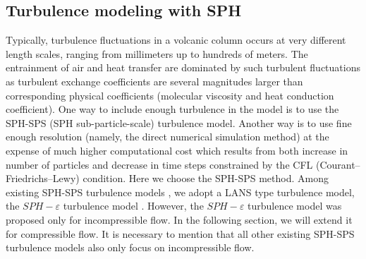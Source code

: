 \documentclass[journal abbreviation, manuscript]{copernicus}
\begin{document}
\subsection{Turbulence modeling with SPH}
Typically, turbulence fluctuations in a volcanic column occurs at very different length scales, ranging from millimeters up to hundreds of meters. The entrainment of air and heat transfer are dominated by such turbulent fluctuations as turbulent exchange coefficients are several magnitudes larger than corresponding physical coefficients (molecular viscosity and heat conduction coefficient). One way to include enough turbulence in the model is to use the SPH-SPS (SPH sub-particle-scale) turbulence model. 
Another way is to use fine enough resolution (namely, the direct numerical simulation method) at the expense of much higher computational cost which results from both increase in number of particles and decrease in time steps constrained by the CFL (Courant–Friedrichs–Lewy) condition. Here we choose the SPH-SPS method. Among existing SPH-SPS turbulence models \citep{holm1999fluctuation, monaghan2002sph, violeau2007numerical, monaghan2011turbulence}, we adopt a LANS type turbulence model, the $SPH-\varepsilon$ turbulence model \citep{monaghan2011turbulence}. However, the $SPH-\varepsilon$ turbulence model was proposed only for incompressible flow. In the following section, we will extend it for compressible flow. It is necessary to mention that all other existing SPH-SPS turbulence models \citep{holm1999fluctuation, monaghan2002sph, violeau2007numerical} also only focus on incompressible flow.

% 
\end{document}
